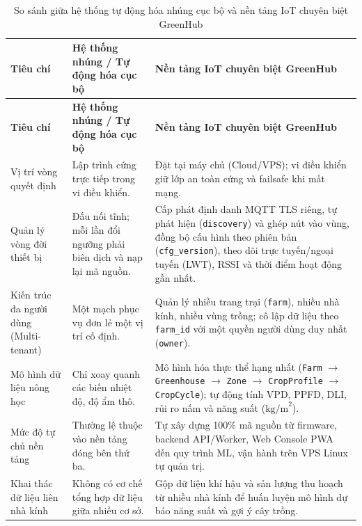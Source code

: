 \begingroup
\footnotesize
\setlength{\tabcolsep}{4pt}
\renewcommand{\arraystretch}{1.15}
\begin{longtable}{|>{\raggedright\arraybackslash}p{}|>{\raggedright\arraybackslash}p{}|>{\raggedright\arraybackslash}p{}|}
\caption{So sánh giữa hệ thống tự động hóa nhúng cục bộ và nền tảng IoT chuyên biệt GreenHub}\label{tab:iot-vs-embedded}\\
\hline
\textbf{Tiêu chí} & \textbf{Hệ thống nhúng / Tự động hóa cục bộ} & \textbf{Nền tảng IoT chuyên biệt GreenHub} \\
\hline
\endfirsthead
\hline
\textbf{Tiêu chí} & \textbf{Hệ thống nhúng / Tự động hóa cục bộ} & \textbf{Nền tảng IoT chuyên biệt GreenHub} \\
\hline
\endhead
Vị trí vòng quyết định & Lập trình cứng trực tiếp trong vi điều khiển. & Đặt tại máy chủ (Cloud/VPS); vi điều khiển giữ lớp an toàn cứng và failsafe khi mất mạng. \\
\hline
Quản lý vòng đời thiết bị & Đấu nối tĩnh; mỗi lần đổi ngưỡng phải biên dịch và nạp lại mã nguồn. & Cấp phát định danh MQTT TLS riêng, tự phát hiện (\texttt{discovery}) và ghép nút vào vùng, đồng bộ cấu hình theo phiên bản (\texttt{cfg\_version}), theo dõi trực tuyến/ngoại tuyến (LWT), RSSI và thời điểm hoạt động gần nhất. \\
\hline
Kiến trúc đa người dùng (Multi-tenant) & Một mạch phục vụ đơn lẻ một vị trí cố định. & Quản lý nhiều trang trại (\texttt{farm}), nhiều nhà kính, nhiều vùng trồng; cô lập dữ liệu theo \texttt{farm\_id} với một quyền người dùng duy nhất (\texttt{owner}). \\
\hline
Mô hình dữ liệu nông học & Chỉ xoay quanh các biến nhiệt độ, độ ẩm thô. & Mô hình hóa thực thể hạng nhất (\texttt{Farm} \(\rightarrow\) \texttt{Greenhouse} \(\rightarrow\) \texttt{Zone} \(\rightarrow\) \texttt{CropProfile} \(\rightarrow\) \texttt{CropCycle}); tự động tính VPD, PPFD, DLI, rủi ro nấm và năng suất (\(\text{kg/m}^2\)). \\
\hline
Mức độ tự chủ nền tảng & Thường lệ thuộc vào nền tảng đóng bên thứ ba. & Tự xây dựng 100\% mã nguồn từ firmware, backend API/Worker, Web Console PWA đến quy trình ML, vận hành trên VPS Linux tự quản trị. \\
\hline
Khai thác dữ liệu liên nhà kính & Không có cơ chế tổng hợp dữ liệu giữa nhiều cơ sở. & Gộp dữ liệu khí hậu và sản lượng thu hoạch từ nhiều nhà kính để huấn luyện mô hình dự báo năng suất và gợi ý cây trồng. \\
\hline
\end{longtable}
\endgroup

